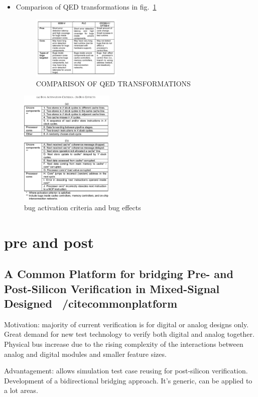 \documentclass[conference]{IEEEtran}
\begin{document}
\begin{itemize}
\item Comparison of QED transformations in fig.~\ref{comp}
\begin{figure}
 \caption{COMPARISON OF QED TRANSFORMATIONS}
\label{comp}
\centering
    \includegraphics[width=0.4\textwidth]{comp}
\end{figure}
 \end{itemize}

\begin{figure}
\caption{bug activation criteria and bug effects}
\label{fig1}
\centering
    \includegraphics[width=0.4\textwidth]{bug}
\end{figure}


\section{pre and post}
\subsection{A Common Platform for bridging Pre- and Post-Silicon Verification in Mixed-Signal Designed ~/cite{commonplatform}}
Motivation: majority of current verification is for digital or analog designs only. Great demand for new test technology to verify both digital and analog together. Physical bus increase due to the rising complexity of the interactions between analog and digital modules and smaller feature sizes.

Advantagement: allows simulation test case reusing for post-silicon verification. Development of a bidirectional bridging approach. It's generic, can be applied to a lot areas.
\end{document}
